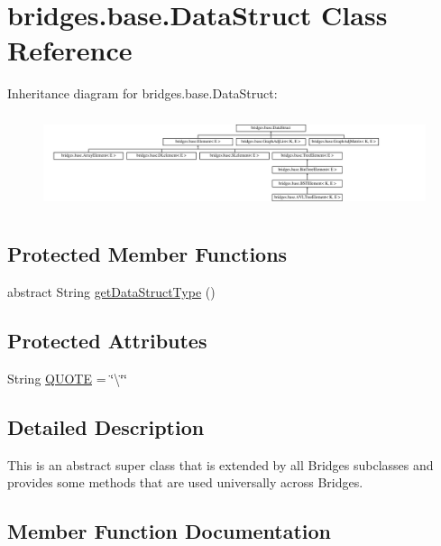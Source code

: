 \hypertarget{classbridges_1_1base_1_1_data_struct}{}\section{bridges.\+base.\+Data\+Struct Class Reference}
\label{classbridges_1_1base_1_1_data_struct}
Inheritance diagram for bridges.\+base.\+Data\+Struct\+:\begin{figure}[H]
\begin{center}
\leavevmode
\includegraphics[height=2.788382cm]{classbridges_1_1base_1_1_data_struct}
\end{center}
\end{figure}
\subsection*{Protected Member Functions}
\begin{DoxyCompactItemize}
\item 
abstract String \hyperlink{classbridges_1_1base_1_1_data_struct_a3bae9d0d68a85e517a34be482e90fdd4}{get\+Data\+Struct\+Type} ()
\end{DoxyCompactItemize}
\subsection*{Protected Attributes}
\begin{DoxyCompactItemize}
\item 
String \hyperlink{classbridges_1_1base_1_1_data_struct_aac4a6ea28f44676274120ba1dddafc1f}{Q\+U\+O\+T\+E} = \char`\"{}\textbackslash{}\char`\"{}\char`\"{}
\end{DoxyCompactItemize}


\subsection{Detailed Description}
This is an abstract super class that is extended by all Bridges subclasses and provides some methods that are used universally across Bridges. 

\subsection{Member Function Documentation}
\hypertarget{classbridges_1_1base_1_1_data_struct_a3bae9d0d68a85e517a34be482e90fdd4}{}

